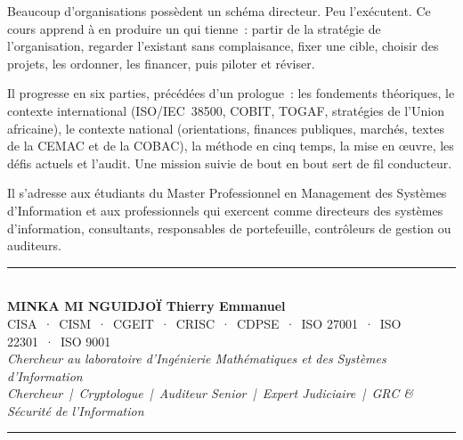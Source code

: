 \documentclass[12pt, twoside, openright, a4paper]{book}
\begin{document}
\vspace{1cm}

\begin{center}
\begin{minipage}{0.75\textwidth}
\color{white!85!gray}
Beaucoup d'organisations possèdent un schéma directeur. Peu l'exécutent. Ce cours apprend à en
produire un qui tienne~: partir de la stratégie de l'organisation, regarder l'existant sans complaisance,
fixer une cible, choisir des projets, les ordonner, les financer, puis piloter et réviser.

\medskip

Il progresse en six parties, précédées d'un prologue~: les fondements théoriques, le contexte international
(ISO/IEC~38500, COBIT, TOGAF, stratégies de l'Union africaine), le contexte national (orientations, finances
publiques, marchés, textes de la CEMAC et de la COBAC), la méthode en cinq temps, la mise en œuvre, les défis
actuels et l'audit. Une mission suivie de bout en bout sert de fil conducteur.

\medskip

Il s'adresse aux étudiants du Master Professionnel en Management des Systèmes d'Information et aux
professionnels qui exercent comme directeurs des systèmes d'information, consultants, responsables de
portefeuille, contrôleurs de gestion ou auditeurs.
\end{minipage}
\end{center}

\vfill

\begin{center}
    {\color{CouleurAccent}\rule{0.7\linewidth}{1.2pt}}\\[1.2ex]
    {\color{white}\large\bfseries MINKA MI NGUIDJOÏ Thierry Emmanuel}\\[0.4ex]
    {\color{white!80!gray}\small
        CISA~·~CISM~·~CGEIT~·~CRISC~·~CDPSE~·~ISO 27001~·~ISO 22301~·~ISO 9001}\\[0.3ex]
    {\color{white!70!gray}\footnotesize\itshape
        Chercheur au laboratoire d'Ingénierie Mathématiques et des Systèmes d'Information}\\[0.3ex]
    {\color{white!70!gray}\footnotesize\itshape
        Chercheur~|~Cryptologue~|~Auditeur Senior~|~Expert Judiciaire~|~GRC \& Sécurité de l'Information}\\[1.2ex]
    {\color{CouleurAccent}\rule{0.7\linewidth}{1.2pt}}
\end{center}

\vspace{1cm}

\afterpage{\nopagecolor}
\end{document}
